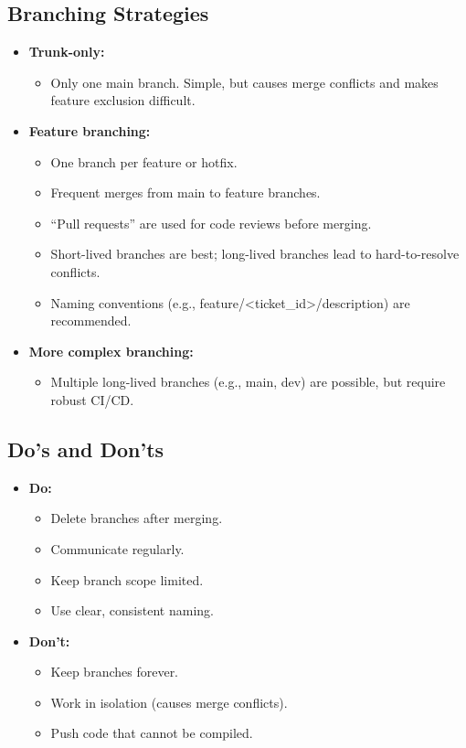 \documentclass[11pt,a4paper]{article}
\begin{document}
\subsection*{Branching Strategies}
\begin{itemize}
    \item \textbf{Trunk-only:}
        \begin{itemize}
            \item Only one main branch. Simple, but causes merge conflicts and makes feature exclusion difficult.
        \end{itemize}
    \item \textbf{Feature branching:}
        \begin{itemize}
            \item One branch per feature or hotfix.
            \item Frequent merges from main to feature branches.
            \item ``Pull requests'' are used for code reviews before merging.
            \item Short-lived branches are best; long-lived branches lead to hard-to-resolve conflicts.
            \item Naming conventions (e.g., feature/\textless ticket\_id\textgreater/description) are recommended.
        \end{itemize}
    \item \textbf{More complex branching:}
        \begin{itemize}
            \item Multiple long-lived branches (e.g., main, dev) are possible, but require robust CI/CD.
        \end{itemize}
\end{itemize}

\subsection*{Do’s and Don’ts}
\begin{itemize}
    \item \textbf{Do:}
        \begin{itemize}
            \item Delete branches after merging.
            \item Communicate regularly.
            \item Keep branch scope limited.
            \item Use clear, consistent naming.
        \end{itemize}
    \item \textbf{Don’t:}
        \begin{itemize}
            \item Keep branches forever.
            \item Work in isolation (causes merge conflicts).
            \item Push code that cannot be compiled.
        \end{itemize}
\end{itemize}
\end{document}
